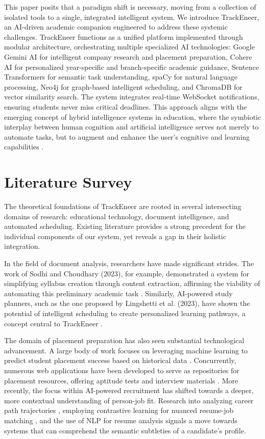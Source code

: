 \documentclass[conference]{IEEEtran}
\begin{document}
This paper posits that a paradigm shift is necessary, moving from a collection of isolated tools to a single, integrated intelligent system. We introduce TrackEneer, an AI-driven academic companion engineered to address these systemic challenges. TrackEneer functions as a unified platform implemented through modular architecture, orchestrating multiple specialized AI technologies: Google Gemini AI for intelligent company research and placement preparation, Cohere AI for personalized year-specific and branch-specific academic guidance, Sentence Transformers for semantic task understanding, spaCy for natural language processing, Neo4j for graph-based intelligent scheduling, and ChromaDB for vector similarity search. The system integrates real-time WebSocket notifications, ensuring students never miss critical deadlines. This approach aligns with the emerging concept of hybrid intelligence systems in education, where the symbiotic interplay between human cognition and artificial intelligence serves not merely to automate tasks, but to augment and enhance the user's cognitive and learning capabilities \cite{b10}.

\section{Literature Survey}
The theoretical foundations of TrackEneer are rooted in several intersecting domains of research: educational technology, document intelligence, and automated scheduling. Existing literature provides a strong precedent for the individual components of our system, yet reveals a gap in their holistic integration.

In the field of document analysis, researchers have made significant strides. The work of Sodhi and Choudhary (2023), for example, demonstrated a system for simplifying syllabus creation through content extraction, affirming the viability of automating this preliminary academic task \cite{b1}. Similarly, AI-powered study planners, such as the one proposed by Lingshetti et al. (2023), have shown the potential of intelligent scheduling to create personalized learning pathways, a concept central to TrackEneer \cite{b4}.

The domain of placement preparation has also seen substantial technological advancement. A large body of work focuses on leveraging machine learning to predict student placement success based on historical data \cite{b8}. Concurrently, numerous web applications have been developed to serve as repositories for placement resources, offering aptitude tests and interview materials \cite{b5, b6, b9}. More recently, the focus within AI-powered recruitment has shifted towards a deeper, more contextual understanding of person-job fit. Research into analyzing career path trajectories \cite{b11}, employing contrastive learning for nuanced resume-job matching \cite{b12}, and the use of NLP for resume analysis \cite{b13} signals a move towards systems that can comprehend the semantic subtleties of a candidate's profile.
\end{document}

